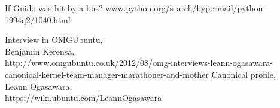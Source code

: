 \documentclass[11pt]{scrartcl}
\begin{document}
If Guido was hit by a bus? www.python.org/search/hypermail/python-1994q2/1040.html

\begin{thebibliography}{9}

      Interview in OMGUbuntu,\\
      Benjamin Kerensa,\\
      http://www.omgubuntu.co.uk/2012/08/omg-interviews-leann-ogasawara-canonical-kernel-team-manager-marathoner-and-mother
    Canonical profile,\\
    Leann Ogasawara,\\
    https://wiki.ubuntu.com/LeannOgasawara

\end{thebibliography}
\end{document}
